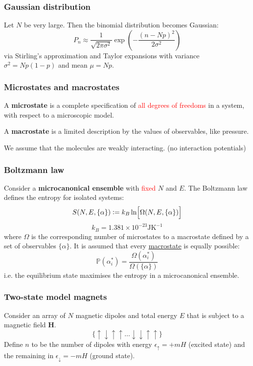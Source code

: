 \documentclass{article}
\newcommand{\deq}{\vcentcolon=}
\newcommand{\vc}[1]{\boldsymbol{#1}}
\begin{document}
\begin{multicols*}{3}
\subsubsection*{Gaussian distribution}
Let $N$ be very large. Then the binomial distribution
becomes Gaussian:
$$P_n\approx\frac{1}{\sqrt{2\pi\sigma^2}}
\exp\left(-\frac{(n-Np)^2}{2\sigma^2}\right)$$
via Stirling's approximation and Taylor expansions
with variance $\sigma^2=Np(1-p)$ and mean $\mu=Np$.

\subsubsection*{Microstates and macrostates}
A \textbf{microstate} is a complete specification of
\textcolor{red}{all degrees of freedoms} in a system,
with respect to a microscopic model.

A \textbf{macrostate} is a limited description
by the values of observables, like pressure.

We assume that the molecules are
weakly interacting. (no interaction potentials)

\subsubsection*{Boltzmann law}
Consider a \textbf{microcanonical ensemble} with
\textcolor{red}{fixed} $N$ and $E$.
The Boltzmann law defines the entropy
for isolated systems:
$$S(N,E,\{\alpha\})\deq k_B\ln\Bigl[
\Omega(N,E,\{\alpha\})\Bigr]$$
$$k_B=1.381\times10^{-23}\text{J}\text{K}^{-1}$$
where $\Omega$ is the corresponding number of microstates
to a macrostate defined by a set of observables $\{\alpha\}$.
It is assumed that every
\underline{macrostate} is equally possible:
$$\mathbb{P}(\alpha^*_i)=
\frac{\Omega(\alpha^*_i)}{\Omega(\{\alpha\})}$$
i.e. the equilibrium state maximises the entropy
in a microcanonical ensemble.

\subsubsection*{Two-state model magnets}
Consider an array of $N$ magnetic dipoles 
and total energy $E$
that is subject to a magnetic field $\vc{H}$.
$$\{\uparrow\downarrow\uparrow\uparrow\dots
\downarrow\downarrow\uparrow\uparrow\}$$
Define $n$ to be the number of
dipoles with energy $\epsilon_{\uparrow}=+mH$
(excited state) and the remaining
in $\epsilon_{\downarrow}=-mH$ (ground state).


\end{multicols*}
\end{document}
